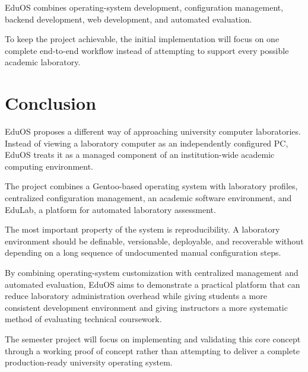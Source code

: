\documentclass[12pt,a4paper]{article}
\begin{document}
EduOS combines operating-system development, configuration management, backend development, web development, and automated evaluation.

To keep the project achievable, the initial implementation will focus on one complete end-to-end workflow instead of attempting to support every possible academic laboratory.

\section{Conclusion}

EduOS proposes a different way of approaching university computer laboratories. Instead of viewing a laboratory computer as an independently configured PC, EduOS treats it as a managed component of an institution-wide academic computing environment.

The project combines a Gentoo-based operating system with laboratory profiles, centralized configuration management, an academic software environment, and EduLab, a platform for automated laboratory assessment.

The most important property of the system is reproducibility. A laboratory environment should be definable, versionable, deployable, and recoverable without depending on a long sequence of undocumented manual configuration steps.

By combining operating-system customization with centralized management and automated evaluation, EduOS aims to demonstrate a practical platform that can reduce laboratory administration overhead while giving students a more consistent development environment and giving instructors a more systematic method of evaluating technical coursework.

The semester project will focus on implementing and validating this core concept through a working proof of concept rather than attempting to deliver a complete production-ready university operating system.
\end{document}

